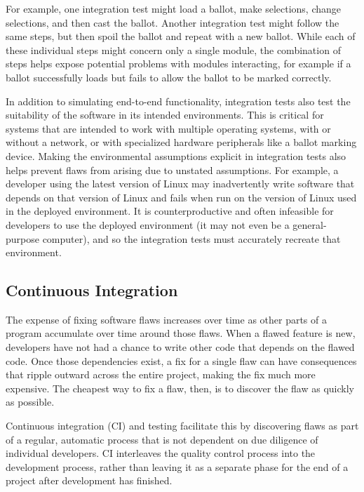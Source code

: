 For example, one integration test might load a ballot, make
selections, change selections, and then cast the ballot. Another
integration test might follow the same steps, but then spoil the
ballot and repeat with a new ballot. While each of these individual
steps might concern only a single module, the combination of steps
helps expose potential problems with modules interacting, for example
if a ballot successfully loads but fails to allow the ballot to be
marked correctly.

In addition to simulating end-to-end functionality, integration tests
also test the suitability of the software in its intended
environments. This is critical for systems that are intended to work
with multiple operating systems, with or without a network, or with
specialized hardware peripherals like a ballot marking device. Making
the environmental assumptions explicit in integration tests also helps
prevent flaws from arising due to unstated assumptions. For example, a
developer using the latest version of Linux may inadvertently write
software that depends on that version of Linux and fails when run on
the version of Linux used in the deployed environment. It is
counterproductive and often infeasible for developers to use the
deployed environment (it may not even be a general-purpose computer),
and so the integration tests must accurately recreate that
environment.

\subsection{Continuous Integration}

The expense of fixing software flaws increases over time as other
parts of a program accumulate over time around those flaws. When a
flawed feature is new, developers have not had a chance to write other
code that depends on the flawed code. Once those dependencies exist, a
fix for a single flaw can have consequences that ripple outward across
the entire project, making the fix much more expensive. The cheapest
way to fix a flaw, then, is to discover the flaw as quickly as
possible.

Continuous integration (CI) and testing facilitate this by discovering
flaws as part of a regular, automatic process that is not dependent on
due diligence of individual developers. CI interleaves the quality
control process into the development process, rather than leaving it
as a separate phase for the end of a project after development has
finished.

